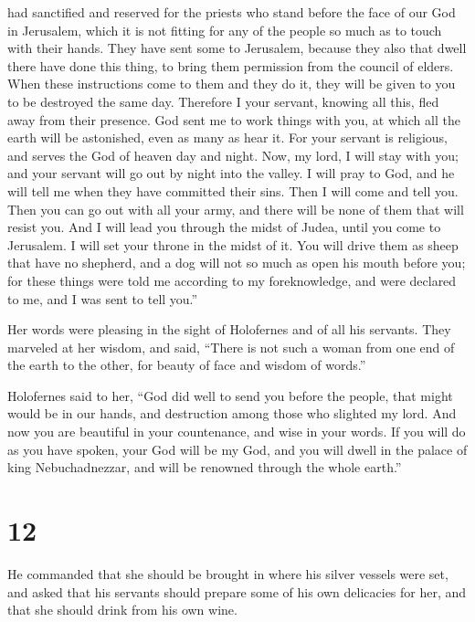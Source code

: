 had sanctified and reserved for the priests who stand before the face of
our God in Jerusalem, which it is not fitting for any of the people so
much as to touch with their hands.  They have sent some
to Jerusalem, because they also that dwell there have done this thing,
to bring them permission from the council of elders. 
When these instructions come to them and they do it, they will be given
to you to be destroyed the same day.  Therefore I your
servant, knowing all this, fled away from their presence. God sent me to
work things with you, at which all the earth will be astonished, even as
many as hear it.  For your servant is religious, and
serves the God of heaven day and night. Now, my lord, I will stay with
you; and your servant will go out by night into the valley. I will pray
to God, and he will tell me when they have committed their sins.
 Then I will come and tell you. Then you can go out with
all your army, and there will be none of them that will resist you.
 And I will lead you through the midst of Judea, until
you come to Jerusalem. I will set your throne in the midst of it. You
will drive them as sheep that have no shepherd, and a dog will not so
much as open his mouth before you; for these things were told me
according to my foreknowledge, and were declared to me, and I was sent
to tell you.''

 Her words were pleasing in the sight of Holofernes and
of all his servants. They marveled at her wisdom, and said,
 ``There is not such a woman from one end of the earth to
the other, for beauty of face and wisdom of words.''

 Holofernes said to her, ``God did well to send you
before the people, that might would be in our hands, and destruction
among those who slighted my lord.  And now you are
beautiful in your countenance, and wise in your words. If you will do as
you have spoken, your God will be my God, and you will dwell in the
palace of king Nebuchadnezzar, and will be renowned through the whole
earth.''

\hypertarget{section-11}{%
\section{12}\label{section-11}}

 He commanded that she should be brought in where his
silver vessels were set, and asked that his servants should prepare some
of his own delicacies for her, and that she should drink from his own
wine.

